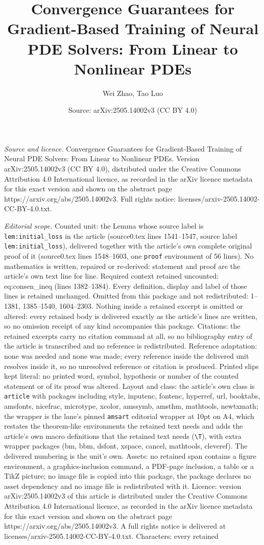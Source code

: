 \documentclass[10pt,a4paper]{amsart}
\title[Convergence Guarantees for Gradient-Based Training of Neural]{Convergence Guarantees for Gradient-Based Training of Neural PDE Solvers: From Linear to Nonlinear PDEs}
\author{Wei Zhao, Tao Luo}
\date{Source: arXiv:2505.14002v3 (CC BY 4.0)}
\begin{document}
\maketitle

\noindent\emph{Source and licence.} Convergence Guarantees for Gradient-Based Training of Neural PDE Solvers: From Linear to Nonlinear PDEs. Version arXiv:2505.14002v3 (CC BY 4.0), distributed under the Creative Commons Attribution 4.0 International licence, as recorded in the arXiv licence metadata for this exact version and shown on the abstract page https://arxiv.org/abs/2505.14002v3. Full rights notice: licenses/arxiv-2505.14002-CC-BY-4.0.txt.\par\smallskip

\noindent\textit{Editorial scope.} Counted unit: the Lemma whose source label is \texttt{lem:initial\_loss} in the article (source0.tex lines 1541--1547, source label \texttt{lem:initial\_loss}), delivered together with the article's own complete original proof of it (source0.tex lines 1548--1603, one \texttt{proof} environment of 56 lines). No mathematics is written, repaired or re-derived: statement and proof are the article's own text line for line. Required context retained uncounted: eq:consen\_ineq (lines 1382--1384). Every definition, display and label of those lines is retained unchanged. Omitted from this package and not redistributed: 1--1381, 1385--1540, 1604--2303. Nothing inside a retained excerpt is omitted or altered: every retained body is delivered exactly as the article's lines are written, so no omission receipt of any kind accompanies this package. Citations: the retained excerpts carry no citation command at all, so no bibliography entry of the article is transcribed and no reference is redistributed. Reference adaptation: none was needed and none was made; every reference inside the delivered unit resolves inside it, so no unresolved reference or citation is produced. Printed slips kept literal: no printed word, symbol, hypothesis or number of the counted statement or of its proof was altered. Layout and class: the article's own class is \texttt{article} with packages including style, inputenc, fontenc, hyperref, url, booktabs, amsfonts, nicefrac, microtype, xcolor, amssymb, amsthm, mathtools, newtxmath; the wrapper is the lane's pinned \texttt{amsart} editorial wrapper at 10pt on A4, which restates the theorem-like environments the retained text needs and adds the article's own macro definitions that the retained text needs (\texttt{\textbackslash T}), with extra wrapper packages (bm, bbm, dsfont, xspace, cancel, mathtools, cleveref). The delivered numbering is the unit's own. Assets: no retained span contains a figure environment, a graphics-inclusion command, a PDF-page inclusion, a table or a TikZ picture; no image file is copied into this package, the package declares no asset dependency and no image file is redistributed with it. Licence: version arXiv:2505.14002v3 of this article is distributed under the Creative Commons Attribution 4.0 International licence, as recorded in the arXiv licence metadata for this exact version and shown on the abstract page https://arxiv.org/abs/2505.14002v3. A full rights notice is delivered at licenses/arxiv-2505.14002-CC-BY-4.0.txt. Characters: every retained 
\end{document}
